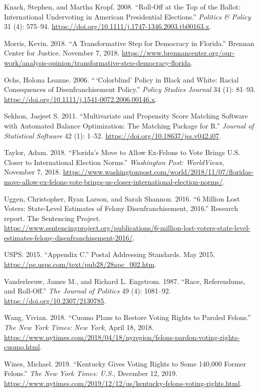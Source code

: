 \documentclass[
  12pt,
]{article}
\newlength{\cslhangindent}
\newenvironment{cslreferences}%
  {\setlength{\parindent}{0pt}%
  \everypar{\setlength{\hangindent}{\cslhangindent}}\ignorespaces}%
  {\par}
\begin{document}
\begin{cslreferences}
\leavevmode\hypertarget{ref-Knack2008}{}%
Knack, Stephen, and Martha Kropf. 2008. ``Roll-Off at the Top of the Ballot: International Undervoting in American Presidential Elections.'' \emph{Politics \& Policy} 31 (4): 575--94. \url{https://doi.org/10.1111/j.1747-1346.2003.tb00163.x}.

\leavevmode\hypertarget{ref-Morris2018}{}%
Morris, Kevin. 2018. ``A Transformative Step for Democracy in Florida.'' Brennan Center for Justice. November 7, 2018. \url{https://www.brennancenter.org/our-work/analysis-opinion/transformative-step-democracy-florida}.

\leavevmode\hypertarget{ref-Ochs2006}{}%
Ochs, Holona Leanne. 2006. ``\,`Colorblind' Policy in Black and White: Racial Consequences of Disenfranchisement Policy.'' \emph{Policy Studies Journal} 34 (1): 81--93. \url{https://doi.org/10.1111/j.1541-0072.2006.00146.x}.

\leavevmode\hypertarget{ref-Sekhon2011}{}%
Sekhon, Jasjeet S. 2011. ``Multivariate and Propensity Score Matching Software with Automated Balance Optimization: The Matching Package for R.'' \emph{Journal of Statistical Software} 42 (1): 1--52. \url{https://doi.org/10.18637/jss.v042.i07}.

\leavevmode\hypertarget{ref-Taylor2018}{}%
Taylor, Adam. 2018. ``Florida's Move to Allow Ex-Felons to Vote Brings U.S. Closer to International Election Norms.'' \emph{Washington Post: WorldViews}, November 7, 2018. \url{https://www.washingtonpost.com/world/2018/11/07/floridas-move-allow-ex-felons-vote-brings-us-closer-international-election-norms/}.

\leavevmode\hypertarget{ref-sentencing_2016}{}%
Uggen, Christopher, Ryan Larson, and Sarah Shannon. 2016. ``6 Million Lost Voters: State-Level Estimates of Felony Disenfranchisement, 2016.'' Research report. The Sentencing Project. \url{https://www.sentencingproject.org/publications/6-million-lost-voters-state-level-estimates-felony-disenfranchisement-2016/}.

\leavevmode\hypertarget{ref-USPS2015}{}%
USPS. 2015. ``Appendix C.'' Postal Addressing Standards. May 2015. \url{https://pe.usps.com/text/pub28/28apc_002.htm}.

\leavevmode\hypertarget{ref-Vanderleeuw1987}{}%
Vanderleeuw, James M., and Richard L. Engstrom. 1987. ``Race, Referendums, and Roll-Off.'' \emph{The Journal of Politics} 49 (4): 1081--92. \url{https://doi.org/10.2307/2130785}.

\leavevmode\hypertarget{ref-Wang2018}{}%
Wang, Vivian. 2018. ``Cuomo Plans to Restore Voting Rights to Paroled Felons.'' \emph{The New York Times: New York}, April 18, 2018. \url{https://www.nytimes.com/2018/04/18/nyregion/felons-pardon-voting-rights-cuomo.html}.

\leavevmode\hypertarget{ref-Wines2019}{}%
Wines, Michael. 2019. ``Kentucky Gives Voting Rights to Some 140,000 Former Felons.'' \emph{The New York Times: U.S.}, December 12, 2019. \url{https://www.nytimes.com/2019/12/12/us/kentucky-felons-voting-rights.html}.
\end{cslreferences}
\end{document}
